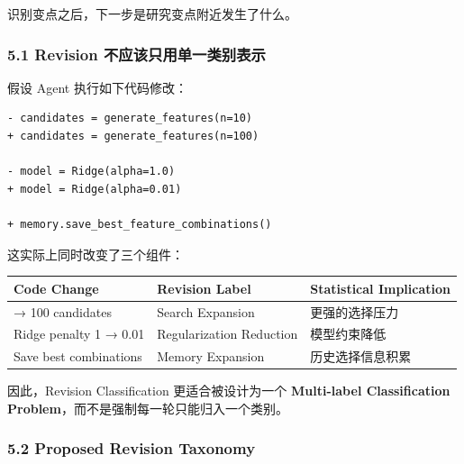 识别变点之后，下一步是研究变点附近发生了什么。

\hypertarget{part-3-48-0001-revision-ux4e0dux5e94ux8be5ux53eaux7528ux5355ux4e00ux7c7bux522bux8868ux793a}{%
\subsubsection{5.1 Revision 不应该只用单一类别表示}\label{part-3-48-0001-revision-ux4e0dux5e94ux8be5ux53eaux7528ux5355ux4e00ux7c7bux522bux8868ux793a}}

假设 Agent 执行如下代码修改：

\begin{verbatim}
- candidates = generate_features(n=10)
+ candidates = generate_features(n=100)

- model = Ridge(alpha=1.0)
+ model = Ridge(alpha=0.01)

+ memory.save_best_feature_combinations()
\end{verbatim}

这实际上同时改变了三个组件：

\begin{readertable}
\begin{longtable}[]{@{}
  >{\raggedright\arraybackslash}p{}
  >{\raggedright\arraybackslash}p{}
  >{\raggedright\arraybackslash}p{}@{}}
\toprule
Code Change & Revision Label & Statistical Implication \\
\midrule
\endhead
10 → 100 candidates & Search Expansion & 更强的选择压力 \\
Ridge penalty 1 → 0.01 & Regularization Reduction & 模型约束降低 \\
Save best combinations & Memory Expansion & 历史选择信息积累 \\
\bottomrule
\end{longtable}
\end{readertable}

因此，Revision Classification 更适合被设计为一个 \textbf{Multi-label Classification Problem}，而不是强制每一轮只能归入一个类别。

\hypertarget{part-3-48-0001-proposed-revision-taxonomy}{%
\subsubsection{5.2 Proposed Revision Taxonomy}\label{part-3-48-0001-proposed-revision-taxonomy}}

